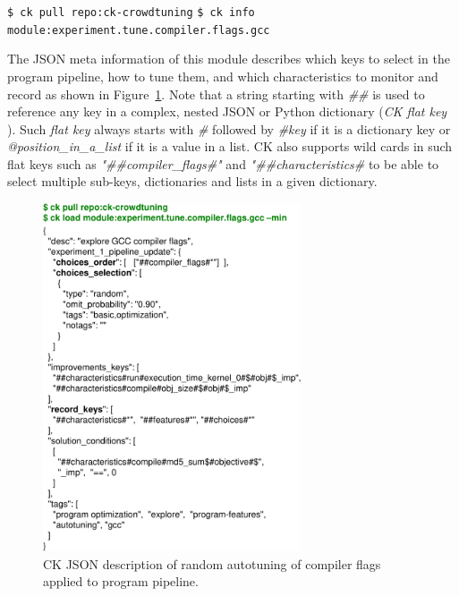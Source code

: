 \begin{flushleft}
\texttt{\$ ck pull repo:ck-crowdtuning}\newline
\texttt{\$ ck info module:experiment.tune.compiler.flags.gcc}\newline
\end{flushleft}

The JSON meta information of this module describes which keys to select
in the program pipeline, how to tune them, and which characteristics to monitor
and record as shown in Figure~\ref{fig:ck-gcc-tuning-meta}.
%
Note that a string starting with \emph{\#\#} is used to reference any key
in a complex, nested JSON or Python dictionary (\textit{CK flat key} \cite{fursin:hal-01054763}).
%
Such \emph{flat key} always starts with \emph{\#} 
followed by \emph{\#key} if it is a dictionary key or
\emph{@position\_in\_a\_list} if it is a value in a list. 
%
CK also supports wild cards in such flat keys 
such as \emph{"\#\#compiler\_flags\#\*"} and \emph{"\#\#characteristics\#\*}
to be able to select multiple sub-keys, dictionaries 
and lists in a given dictionary.


   \begin{figure}[]
     \centering
      \includegraphics[width=3.0in]
      {ck-assets/4c2fb19c5b0fd89a-cropped.pdf} %
     \caption{
       CK JSON description of random autotuning of compiler flags applied to program pipeline.
     }
     \label{fig:ck-gcc-tuning-meta}
   \end{figure}

